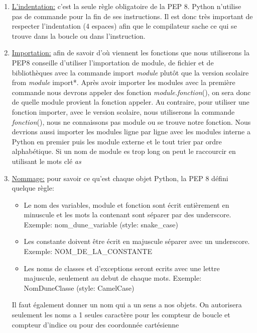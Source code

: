 \begin{enumerate}


	\label{PEP8:point1}\item \underline{L'indentation:} c'est la seule règle obligatoire de la PEP 8. Python n'utilise pas de commande pour la fin de ses instructions. Il est donc très important de respecter l'indentation (4 espaces) afin que le compilateur sache ce qui se trouve dans la boucle ou dans l'instruction.
	
	\label{PEP8:point2}\item \underline{Importation:} afin de savoir d'où viennent les fonctions que nous utiliserons la PEP8 conseille d'utiliser l'importation de module, de fichier et de bibliothèques avec la commande import \textit{module} plutôt que la version scolaire from \textit{module} import*. Après avoir importer les modules avec la première commande nous devrons appeler des fonction \textit{module.fonction}(), on sera donc de quelle module provient la fonction appeler. Au contraire, pour utiliser une fonction importer, avec le version scolaire, nous utiliserons la commande \textit{fonction}(), nous ne connaissons pas module ou se trouve notre fonction. Nous devrions aussi importer les modules ligne par ligne avec les modules interne a Python en premier puis les module externe et le tout trier par ordre alphabétique. Si un nom de module es trop long on peut le raccourcir en utilisant le mots clé \textit{as}
	
	\label{PEP8:point3}\item \underline{Nommage:} pour savoir ce qu'est chaque objet Python, la PEP 8 défini quelque règle:
	
	\begin{itemize}[label=\textbullet]
	
		\item Le nom des variables, module et fonction sont écrit entièrement en minuscule et les mots la contenant sont séparer par des underscore. Exemple: nom\_dune\_variable (style: snake\_case)
		
		\item Les constante doivent être écrit en majuscule séparer avec un underscore. Exemple: NOM\_DE\_LA\_CONSTANTE
		
		\item Les noms de classes et d'exceptions seront ecrits avec une lettre majuscule, seulement au debut de chaque mots. Exemple: NomDuneClasse (style: CamelCase)
		
		
	\end{itemize}
	Il faut également donner un nom qui a un sens a nos objets. On autorisera seulement les noms a 1 seules caractère pour les  compteur de boucle et compteur d'indice ou pour des coordonnée cartésienne
	

\end{enumerate}
